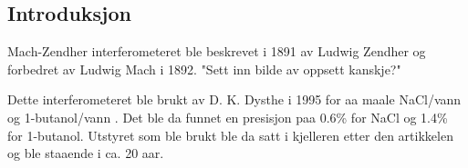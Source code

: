 \subsection {Introduksjon}
  Mach-Zendher interferometeret ble beskrevet i 1891 av Ludwig Zendher\cite{lz}
  og forbedret av Ludwig Mach\cite{lm} i 1892.
  "Sett inn bilde av oppsett kanskje?"

  Dette interferometeret ble brukt av D. K. Dysthe i 1995 for aa maale NaCl/vann og
  1-butanol/vann \cite{dag}. Det ble da funnet en presisjon paa 0.6\% for NaCl og
  1.4\% for 1-butanol. Utstyret som ble brukt ble da satt i kjelleren etter den 
  artikkelen og ble staaende i ca. 20 aar. 
